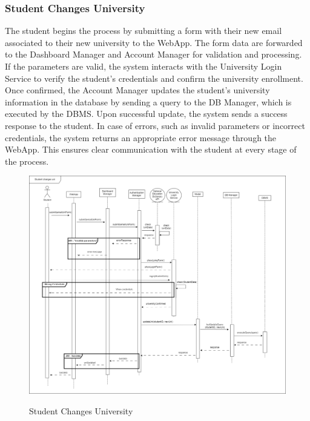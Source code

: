 \documentclass[a4paper,12pt]{article}
\begin{document}
\subsubsection*{Student Changes University}
The student begins the process by submitting a form with their new email associated to their new university to the WebApp. The form data are forwarded to the Dashboard Manager and Account Manager for validation and processing. If the parameters are valid, the system interacts with the University Login Service to verify the student's credentials and confirm the university enrollment. Once confirmed, the Account Manager updates the student's university information in the database by sending a query to the DB Manager, which is executed by the DBMS. Upon successful update, the system sends a success response to the student.
In case of errors, such as invalid parameters or incorrect credentials, the system returns an appropriate error message through the WebApp. This ensures clear communication with the student at every stage of the process.
\begin{figure}[H]
\centering
\includegraphics[scale = 0.35]{DD_figures/RuntimeView/StudentChangesUniversityRV.drawio.png}\\
\caption{Student Changes University}
\end{figure}
\newpage
\end{document}
